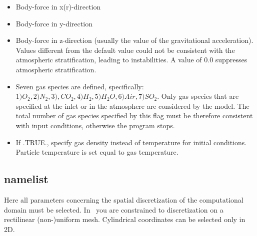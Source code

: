 \begin{itemize}
\item
{}
{Body-force in x(r)-direction}

\item
{}
{Body-force in y-direction}

\item
{}
{Body-force in z-direction (usually the value of the gravitational acceleration).
Values different from the default value could not be consistent with the 
atmospheric stratification, leading to instabilities. A value of 0.0 
suppresses atmospheric stratification}.

\item
{}
{Seven gas species are defined, specifically: \\
$ 1) O_2, 2) N_2, 3), CO_2, 4) H_2, 5) H_2O, 6) Air, 7) SO_2$. 
Only gas species that are specified at the inlet or in the
atmosphere are considered by the model. The total number of gas 
species specified by this flag must be therefore consistent with 
input conditions, otherwise the program stops.}

\item
{}
{If .TRUE., specify gas density instead of temperature for initial conditions.
Particle temperature is set equal to gas temperature.}

\end{itemize}

\subsection{ namelist}
Here all parameters concerning the spatial discretization of the computational
domain must be selected. In \PDAC\ you are constrained to discretization 
on a rectilinear (non-)uniform mesh. Cylindrical coordinates can be
selected only in 2D.

